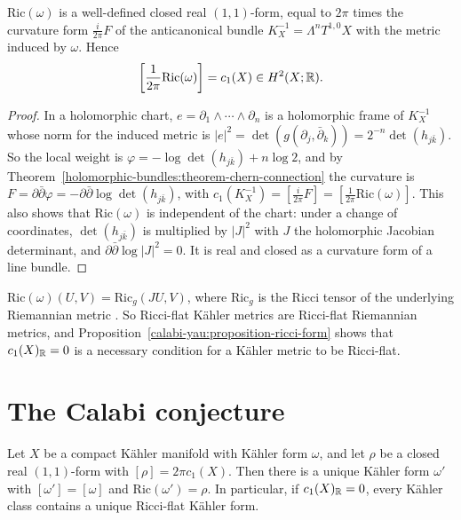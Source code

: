 \begin{proposition}\label{calabi-yau:proposition-ricci-form}
$\mathrm{Ric}(\omega)$ is a well-defined closed real $(1,1)$-form, equal to $2\pi$ times the curvature form $\frac{i}{2\pi}F$ of the anticanonical bundle $K_X^{-1} = \Lambda^nT^{1,0}X$ with
the metric induced by $\omega$. Hence
\[
\left[\frac{1}{2\pi}\mathrm{Ric}(\omega)\right] = c_1(X) \in H^2(X; \mathbb{R}) .
\]
\end{proposition}

\begin{proof}
In a holomorphic chart, $e = \partial_1 \wedge \cdots \wedge \partial_n$ is a holomorphic frame of $K_X^{-1}$ whose norm for the induced metric is $|e|^2 = \det(g(\partial_j, \bar\partial_k)) = 2^{-n}\det(h_{j\bar k})$.
So the local weight is $\varphi = -\log\det(h_{j\bar k}) + n\log 2$, and by Theorem~\ref{holomorphic-bundles:theorem-chern-connection} the curvature is
$F = \partial\bar\partial\varphi = -\partial\bar\partial\log\det(h_{j\bar k})$, with $c_1(K_X^{-1}) = [\frac{i}{2\pi}F] = [\frac{1}{2\pi}\mathrm{Ric}(\omega)]$. This also shows that
$\mathrm{Ric}(\omega)$ is independent of the chart: under a change of coordinates, $\det(h_{j\bar k})$ is multiplied by $|J|^2$ with $J$ the holomorphic Jacobian determinant, and
$\partial\bar\partial\log|J|^2 = 0$. It is real and closed as a curvature form of a line bundle.
\end{proof}

\begin{remark}\label{calabi-yau:remark-riemannian-ricci}
$\mathrm{Ric}(\omega)(U, V) = \mathrm{Ric}_g(JU, V)$, where $\mathrm{Ric}_g$ is the Ricci tensor of the underlying Riemannian metric \cite[Chapter 4]{huybrechts-complex}. So
Ricci-flat K\"ahler metrics are Ricci-flat Riemannian metrics, and Proposition~\ref{calabi-yau:proposition-ricci-form} shows that $c_1(X)_{\mathbb{R}} = 0$ is a necessary
condition for a K\"ahler metric to be Ricci-flat.
\end{remark}

\section{The Calabi conjecture}\label{calabi-yau:section-calabi-conjecture}

\begin{theorem}\label{calabi-yau:theorem-yau}
Let $X$ be a compact K\"ahler manifold with K\"ahler form $\omega$, and let $\rho$ be a closed real $(1,1)$-form with $[\rho] = 2\pi c_1(X)$. Then there is a unique K\"ahler form
$\omega'$ with $[\omega'] = [\omega]$ and $\mathrm{Ric}(\omega') = \rho$. In particular, if $c_1(X)_{\mathbb{R}} = 0$, every K\"ahler class contains a unique Ricci-flat K\"ahler form.
\end{theorem}

